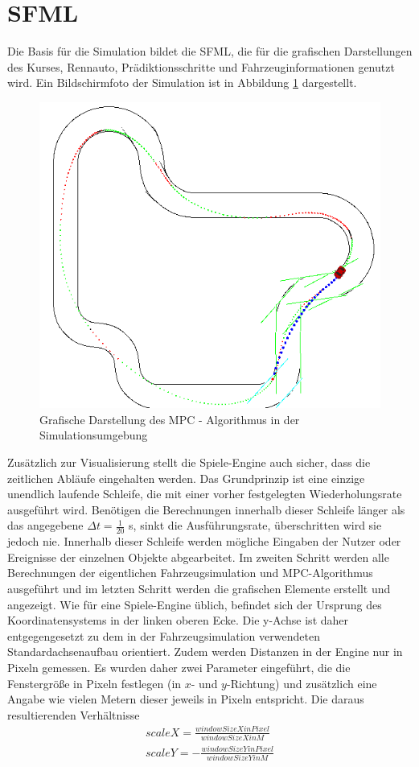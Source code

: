 \documentclass{like}
\begin{document}
\section{\acl{SFML}}
Die Basis für die Simulation bildet die \ac{SFML}, die für die grafischen Darstellungen des Kurses, Rennauto, Prädiktionsschritte und Fahrzeuginformationen genutzt wird. Ein Bildschirmfoto der Simulation ist in Abbildung \ref{fig:simVisual} dargestellt.
\begin{figure}[ht!]
	\centering
	\includegraphics[width=350pt]{Abbildungen/sim_visual.png}
	\caption{Grafische Darstellung des MPC - Algorithmus in der Simulationsumgebung}
	\label{fig:simVisual}
\end{figure} 
Zusätzlich zur Visualisierung stellt die Spiele-Engine auch sicher, dass die zeitlichen Abläufe eingehalten werden. Das Grundprinzip ist eine einzige unendlich laufende Schleife, die mit einer vorher festgelegten Wiederholungsrate ausgeführt wird. Benötigen die Berechnungen innerhalb dieser Schleife länger als das angegebene
$\Delta t =  \frac{1}{20}$ s, sinkt die Ausführungsrate, überschritten wird sie jedoch nie. Innerhalb dieser Schleife werden mögliche Eingaben der Nutzer oder Ereignisse der einzelnen Objekte abgearbeitet. Im zweiten Schritt werden alle Berechnungen der eigentlichen Fahrzeugsimulation und \ac{MPC}-Algorithmus ausgeführt und im letzten Schritt werden die grafischen Elemente erstellt und angezeigt. Wie für eine Spiele-Engine üblich, befindet sich der Ursprung des Koordinatensystems in der linken oberen Ecke. Die y-Achse ist daher entgegengesetzt zu dem in der Fahrzeugsimulation verwendeten Standardachsenaufbau orientiert. Zudem werden Distanzen in der Engine nur in Pixeln gemessen. Es wurden daher zwei Parameter eingeführt, die die Fenstergröße in Pixeln festlegen (in \(x\)- und  \(y\)-Richtung) und zusätzlich eine Angabe wie vielen Metern dieser jeweils in Pixeln entspricht. Die daraus resultierenden Verhältnisse 
\begin{eqnarray}
	scaleX = \frac{windowSizeXinPixel}{windowSizeXinM} \\
	scaleY = - \frac{windowSizeYinPixel}{windowSizeYinM} 
\end{eqnarray}
\end{document}
